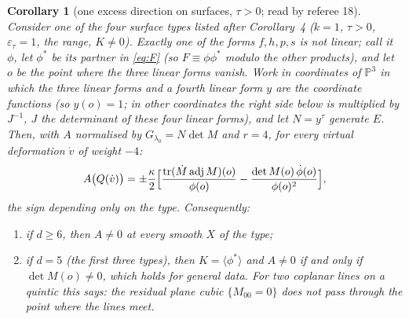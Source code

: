 \documentclass[11pt]{article}
\numberwithin{equation}{section}
\newtheorem{corollary}[theorem]{Corollary}
\theoremstyle{remark}
\newcommand{\PP}{\mathbb{P}}
\newcommand{\lz}{\lambda_0}
\newcommand{\et}{\varepsilon_\tau}
\begin{document}
\begin{corollary}[one excess direction on surfaces, $\tau>0$; read by referee 18]\label{cor:surf}
Consider one of the four surface types listed after Corollary~4 ($k=1$, $\tau>0$,
$\et=1$, the range, $K\ne0$). Exactly one of the forms $f,h,p,s$ is not linear; call it $\phi$, let $\phi^*$ be
its partner in \eqref{eq:F} (so $F\equiv\phi\phi^*$ modulo the other products), and let $o$ be the point where the
three linear forms vanish. Work in coordinates of $\PP^3$ in which the three linear forms and a fourth linear
form $y$ are the coordinate functions (so $y(o)=1$; in other coordinates the right side below is multiplied by
$J^{-1}$, $J$ the determinant of these four linear forms), and let $N=y^\tau$ generate $E$. Then, with $A$
normalised by $G_{\lz}=N\det M$ and $r=4$, for every virtual deformation $\dot v$ of weight $-4$:
\[
A\bigl(Q(\dot v)\bigr)=\pm\frac{\kappa}{2}\Bigl[\frac{\operatorname{tr}(\dot M\operatorname{adj}M)(o)}{\phi(o)}
-\frac{\det M(o)\,\dot\phi(o)}{\phi(o)^2}\Bigr],
\]
the sign depending only on the type. Consequently:
\begin{enumerate}
\item if $d\ge6$, then $A\ne0$ at every smooth $X$ of the type;
\item if $d=5$ (the first three types), then $K=\langle\phi^*\rangle$ and $A\ne0$ if and only if $\det M(o)\ne0$,
which holds for general data. For two coplanar lines on a quintic this says: the residual plane cubic
$\{M_{00}=0\}$ does not pass through the point where the lines meet.
\end{enumerate}
\end{corollary}
\end{document}
